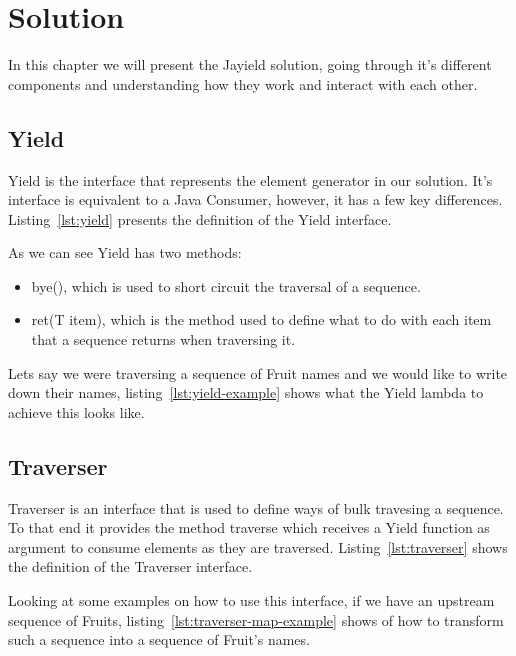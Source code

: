 \chapter{Solution}

In this chapter we will present the Jayield solution, going through it's different components and understanding how they work and interact with each other.
\section{Yield}

Yield is the interface that represents the element generator in our solution. It's interface is equivalent to a Java Consumer, however, it has a few key differences. Listing~\ref{lst:yield} presents the definition of the Yield interface.



As we can see Yield has two methods:
\begin{itemize}
\item bye(), which is used to short circuit the traversal of a sequence.
\item ret(T item), which is the method used to define what to do with each item that a sequence returns when traversing it.
\end{itemize}

Lets say we were traversing a sequence of Fruit names and we would like to write down their names, listing~\ref{lst:yield-example} shows what the Yield lambda to achieve this looks like.



\section{Traverser}

Traverser is an interface that is used to define ways of bulk travesing a sequence. To that end it provides the method traverse which receives a Yield function as argument to consume elements as they are traversed. Listing~\ref{lst:traverser} shows the definition of the Traverser interface.



Looking at some examples on how to use this interface, if we have an upstream sequence of Fruits, listing~\ref{lst:traverser-map-example} shows of how to transform such a sequence into a sequence of Fruit's names.

